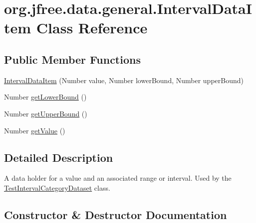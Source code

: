 \hypertarget{classorg_1_1jfree_1_1data_1_1general_1_1_interval_data_item}{}\section{org.\+jfree.\+data.\+general.\+Interval\+Data\+Item Class Reference}
\label{classorg_1_1jfree_1_1data_1_1general_1_1_interval_data_item}
\subsection*{Public Member Functions}
\begin{DoxyCompactItemize}
\item 
\mbox{\hyperlink{classorg_1_1jfree_1_1data_1_1general_1_1_interval_data_item_a305fc20161364bf7cb7f1c1537c2bb96}{Interval\+Data\+Item}} (Number value, Number lower\+Bound, Number upper\+Bound)
\item 
Number \mbox{\hyperlink{classorg_1_1jfree_1_1data_1_1general_1_1_interval_data_item_ac7b7e05cf54de8e18a7586c309564a90}{get\+Lower\+Bound}} ()
\item 
Number \mbox{\hyperlink{classorg_1_1jfree_1_1data_1_1general_1_1_interval_data_item_a8f34d8d39e248e9216c0ce70a365774a}{get\+Upper\+Bound}} ()
\item 
Number \mbox{\hyperlink{classorg_1_1jfree_1_1data_1_1general_1_1_interval_data_item_ad31563fc52d9e88fb0869643d3560e64}{get\+Value}} ()
\end{DoxyCompactItemize}


\subsection{Detailed Description}
A data holder for a value and an associated range or interval. Used by the \mbox{\hyperlink{classorg_1_1jfree_1_1data_1_1general_1_1_test_interval_category_dataset}{Test\+Interval\+Category\+Dataset}} class. 

\subsection{Constructor \& Destructor Documentation}
\mbox{\label{classorg_1_1jfree_1_1data_1_1general_1_1_interval_data_item_a305fc20161364bf7cb7f1c1537c2bb96}} 
